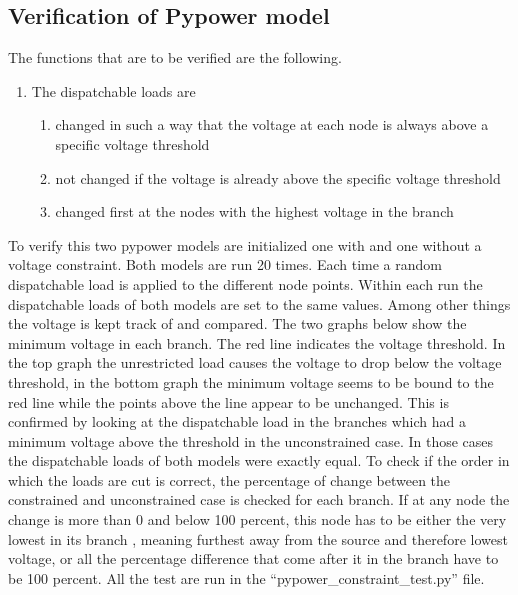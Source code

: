 \documentclass[a4paper]{article}
\begin{document}
\subsection{Verification of Pypower model}
The functions that are to be verified are the following. 
\begin{enumerate}
 \item The dispatchable loads are \begin{enumerate}
                                   \item changed in such a way that  the voltage at each node is 
                                   always above a specific voltage threshold
                                   \item not changed if the voltage is already above the specific voltage threshold
                                   \item changed first at the nodes with the highest voltage in the branch
                                  \end{enumerate}

\end{enumerate}
To verify this two pypower models are initialized one with and  one without a voltage constraint. Both models are 
run 20 times. Each time a random dispatchable load is applied to the different node points. Within each run the 
dispatchable loads of both models are set to the same values. Among other things the voltage is kept track of and compared. 
The two graphs below show the minimum voltage in each branch. The red line indicates the voltage threshold.  In the
top graph the unrestricted load causes the voltage to drop below the voltage threshold, in the bottom graph 
the minimum voltage seems to be bound to the red line while the points above the line appear to be unchanged. 
This is confirmed by looking at the dispatchable load in the branches which had a minimum voltage above the threshold
in the unconstrained case. In those cases the dispatchable loads of both models were exactly equal. To check if the order
in which the loads are cut is correct, the percentage of change between the constrained and unconstrained case is checked
for each branch. If  at any node the change is more than 0 and below 100 percent, this node has to be either the very 
lowest in its branch , meaning furthest away from the source and therefore lowest voltage, or all the percentage difference 
that come after it in the branch have to be 100 percent. 
All the test are run in the “pypower\_constraint\_test.py” file. 
\end{document}
